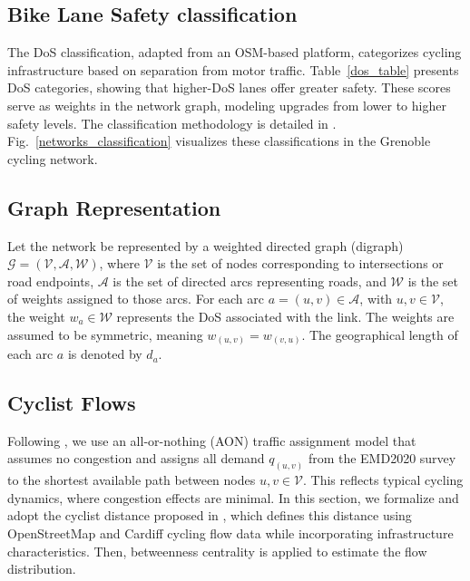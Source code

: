 \documentclass[lettersize,journal]{IEEEtran}
\begin{document}
\subsection{Bike Lane  Safety classification}


The DoS classification, adapted from an OSM-based platform, categorizes cycling infrastructure based on separation from motor traffic. Table~\ref{dos_table} presents DoS categories, showing that higher-DoS lanes offer greater safety. These scores serve as weights in the network graph, modeling upgrades from lower to higher safety levels. The classification methodology is detailed in \cite{2024graphbased}. Fig.~\ref{networks_classification} visualizes these classifications in the Grenoble cycling network.



\subsection{Graph Representation}


Let the network be represented by a weighted directed graph (digraph) $\mathcal{G} = (\mathcal{V}, \mathcal{A}, \mathcal{W})$, where $\mathcal{V}$ is the set of nodes corresponding to intersections or road endpoints, $\mathcal{A}$ is the set of directed arcs representing roads, and $\mathcal{W}$ is the set of weights assigned to those arcs. For each arc $a = (u, v) \in \mathcal{A}$, with $u,v \in \mathcal{V}$, the weight $w_a \in \mathcal{W}$ represents the DoS associated with the link. The weights are assumed to be symmetric, meaning $w_{(u,v)} = w_{(v,u)}$. The geographical length of each arc $a$ is denoted by $d_a$.

\subsection{Cyclist Flows}
\label{section_flows}

Following \cite{mesbah2012bilevel}, we use an all-or-nothing (AON) traffic assignment model that assumes no congestion and assigns all demand $q_{(u,v)}$ from the EMD2020 survey \cite{SMMAG_EMD} to the shortest available path  between nodes $u,v \in \mathcal{V}$. This reflects typical cycling dynamics, where congestion effects are minimal. In this section, we formalize and adopt the cyclist distance proposed in \cite{cooper2017using}, which defines this distance using OpenStreetMap and Cardiff cycling flow data while incorporating infrastructure characteristics. Then, betweenness centrality is applied to estimate the flow distribution.
\end{document}
